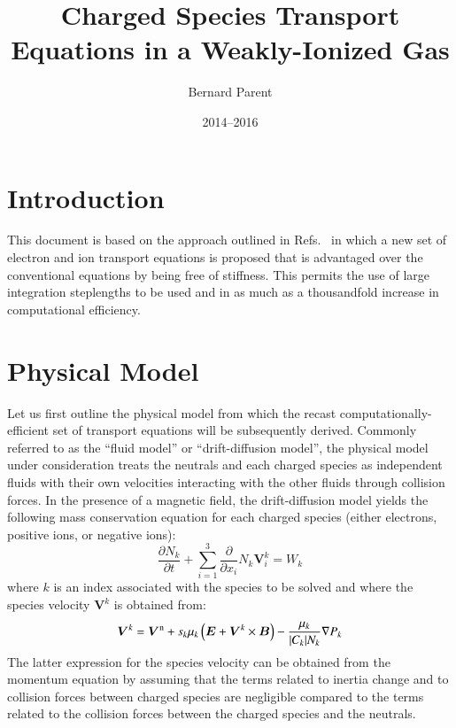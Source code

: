 \documentclass{warpdoc}
\author{
  Bernard Parent
}
\title{
  Charged Species Transport Equations in a Weakly-Ionized Gas  
}
\date{
  2014--2016
}
\renewcommand{\vec}[1]{\bm{#1}}
\begin{document}
  \pagestyle{headings}
  \setcounter{page}{1}
  \makewarpdoctitle
  \tableofcontents


\section{Introduction}

This document is based on the approach outlined in Refs.\ \cite{jcp:2014:parent,jcp:2015:parent} in which a new set of electron and ion transport equations is proposed that is advantaged over the conventional equations by being free of stiffness. This permits the use of large integration steplengths to be used and in as much as a thousandfold increase in computational efficiency.


\section{Physical Model}

Let us first outline the physical model from which the recast computationally-efficient set of transport equations will be subsequently derived. Commonly referred to as the ``fluid model'' or ``drift-diffusion model'', the physical model under consideration treats the neutrals and each charged species as independent fluids with their own velocities interacting with the other fluids through collision forces. In the presence of a magnetic field, the drift-diffusion model yields the following mass conservation equation for each charged species (either electrons, positive ions, or negative ions):
%
\begin{equation}
  \frac{\partial N_k}{\partial t} + \sum_{i=1}^3 \frac{\partial}{\partial x_i} N_k \vec{V}_i^k = W_k
  \label{eqn:massconservation}
\end{equation}
%
where $k$ is an index associated with the species to be solved and where the species velocity $\vec{V}^k$ is obtained from:
%
\begin{equation}
  \vec{V}^k=\vec{V}^{\rm n} + s_k \mu_k \left(\vec{E}+\vec{V}^k \times \vec{B}\right)-\frac{\mu_k}{|C_k| N_k}\nabla P_k
 \label{eqn:Vvector}
\end{equation}
% 
The latter expression for the species velocity can be obtained from the momentum equation by assuming that the terms related to inertia change and to collision forces between charged species are negligible compared to the terms related to the collision forces between the charged species and the neutrals. 
\end{document}

